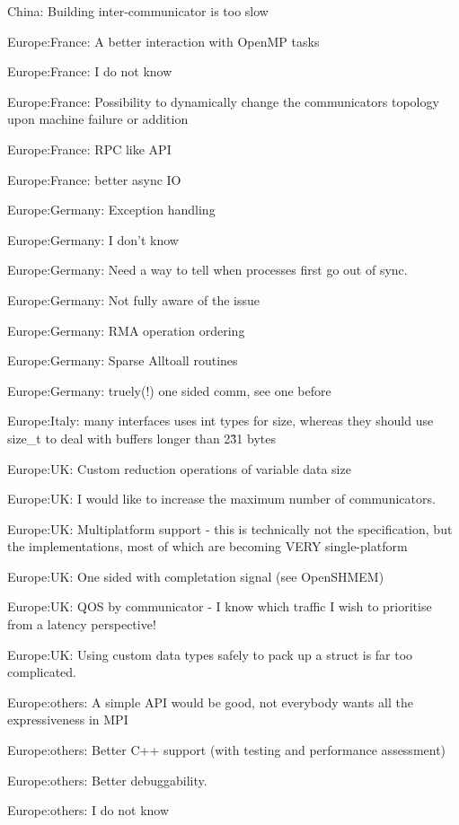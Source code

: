 \item China: Building inter-communicator is too slow
\item Europe:France: A better interaction with OpenMP tasks
\item Europe:France: I do not know
\item Europe:France: Possibility to dynamically change the communicators topology upon machine failure or addition
\item Europe:France: RPC like API
\item Europe:France: better async IO
\item Europe:Germany: Exception handling
\item Europe:Germany: I don't know
\item Europe:Germany: Need a way to tell when processes first go out of sync.
\item Europe:Germany: Not fully aware of the issue
\item Europe:Germany: RMA operation ordering
\item Europe:Germany: Sparse Alltoall routines
\item Europe:Germany: truely(!) one sided comm, see one before
\item Europe:Italy: many interfaces uses int types for size, whereas they should use size\_t to deal with buffers longer than 2\^31 bytes
\item Europe:UK: Custom reduction operations of variable data size
\item Europe:UK: I would like to increase the maximum number of communicators.
\item Europe:UK: Multiplatform support - this is technically not the specification, but the implementations, most of which are becoming VERY single-platform
\item Europe:UK: One sided with completation signal (see OpenSHMEM)
\item Europe:UK: QOS by communicator - I know which traffic I wish to prioritise from a latency perspective!
\item Europe:UK: Using custom data types safely to pack up a struct is far too complicated.
\item Europe:others: A simple API would be good, not everybody wants all the expressiveness in MPI
\item Europe:others: Better C++ support (with testing and performance assessment)
\item Europe:others: Better debuggability.
\item Europe:others: I do not know
